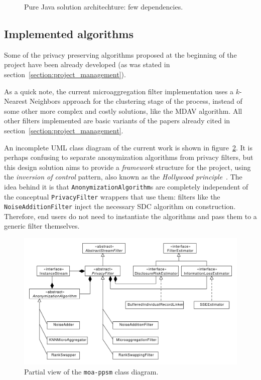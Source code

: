 \begin{figure}[h]
\begin{minipage}[t]{.45\textwidth}
		\caption{Pure Java solution architechture: few dependencies.}
		\label{fig:ppsm-JAVA-arch}
	\end{minipage}
\end{figure}

\subsection{Implemented algorithms}

Some of the privacy preserving algorithms proposed at the beginning of the project have been already developed (as was stated in section~\ref{section:project_management}).

As a quick note, the current microaggregation filter implementation uses a $k$-Nearest Neighbors approach for the clustering stage of the process, instead of some other more complex and costly solutions, like the MDAV algorithm. All other filters implemented are basic variants of the papers already cited in section~\ref{section:project_management}.

An incomplete UML class diagram of the current work is shown in figure~\ref{fig:ppsm-class-diagram}. It is perhaps confusing to separate anonymization algorithms from privacy filters, but this design solution aims to provide a \textit{framework} structure for the project, using the \textit{inversion of control} pattern, also known as the \textit{Hollywood principle}~\cite{website:wikiInversionOfControl}. The idea behind it is that \texttt{AnonymizationAlgorithm}s are completely independent of the conceptual \texttt{PrivacyFilter} wrappers that use them: filters like the \texttt{NoiseAdditionFilter} inject the necessary SDC algorithm on construction. Therefore, end users do not need to instantiate the algorithms and pass them to a generic filter themselves.

\begin{figure}[h]
	\centering
	\includegraphics[width=1.0\textwidth]{figures/ppsm-class-diagram.pdf}
	\caption{Partial view of the \texttt{moa-ppsm} class diagram.}
	\label{fig:ppsm-class-diagram}
\end{figure}

